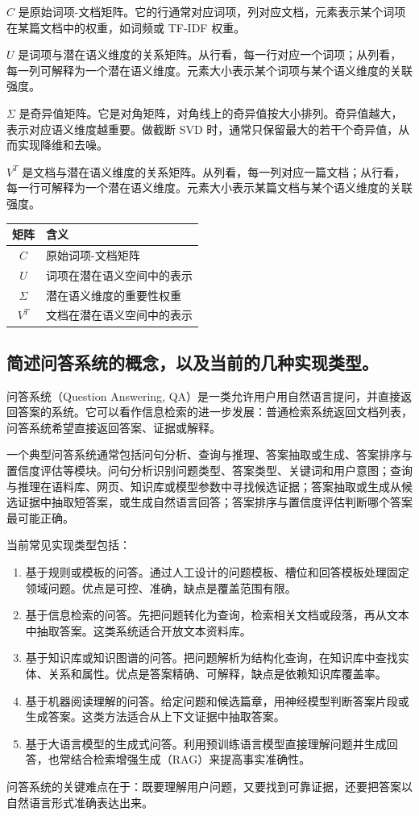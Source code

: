 $C$ 是原始词项-文档矩阵。它的行通常对应词项，列对应文档，元素表示某个词项在某篇文档中的权重，如词频或 TF-IDF 权重。

$U$ 是词项与潜在语义维度的关系矩阵。从行看，每一行对应一个词项；从列看，每一列可解释为一个潜在语义维度。元素大小表示某个词项与某个语义维度的关联强度。

$\Sigma$ 是奇异值矩阵。它是对角矩阵，对角线上的奇异值按大小排列。奇异值越大，表示对应语义维度越重要。做截断 SVD 时，通常只保留最大的若干个奇异值，从而实现降维和去噪。

$V^T$ 是文档与潜在语义维度的关系矩阵。从列看，每一列对应一篇文档；从行看，每一行可解释为一个潜在语义维度。元素大小表示某篇文档与某个语义维度的关联强度。

\begin{table}[H]
\centering
\small
\begin{tabular}{|c|l|}
\hline
矩阵 & 含义 \\ \hline
$C$ & 原始词项-文档矩阵 \\ \hline
$U$ & 词项在潜在语义空间中的表示 \\ \hline
$\Sigma$ & 潜在语义维度的重要性权重 \\ \hline
$V^T$ & 文档在潜在语义空间中的表示 \\ \hline
\end{tabular}
\end{table}

\subsection{简述问答系统的概念，以及当前的几种实现类型。}

问答系统（Question Answering, QA）是一类允许用户用自然语言提问，并直接返回答案的系统。它可以看作信息检索的进一步发展：普通检索系统返回文档列表，问答系统希望直接返回答案、证据或解释。

一个典型问答系统通常包括问句分析、查询与推理、答案抽取或生成、答案排序与置信度评估等模块。问句分析识别问题类型、答案类型、关键词和用户意图；查询与推理在语料库、网页、知识库或模型参数中寻找候选证据；答案抽取或生成从候选证据中抽取短答案，或生成自然语言回答；答案排序与置信度评估判断哪个答案最可能正确。

当前常见实现类型包括：
\begin{enumerate}
  \item 基于规则或模板的问答。通过人工设计的问题模板、槽位和回答模板处理固定领域问题。优点是可控、准确，缺点是覆盖范围有限。
  \item 基于信息检索的问答。先把问题转化为查询，检索相关文档或段落，再从文本中抽取答案。这类系统适合开放文本资料库。
  \item 基于知识库或知识图谱的问答。把问题解析为结构化查询，在知识库中查找实体、关系和属性。优点是答案精确、可解释，缺点是依赖知识库覆盖率。
  \item 基于机器阅读理解的问答。给定问题和候选篇章，用神经模型判断答案片段或生成答案。这类方法适合从上下文证据中抽取答案。
  \item 基于大语言模型的生成式问答。利用预训练语言模型直接理解问题并生成回答，也常结合检索增强生成（RAG）来提高事实准确性。
\end{enumerate}

问答系统的关键难点在于：既要理解用户问题，又要找到可靠证据，还要把答案以自然语言形式准确表达出来。
